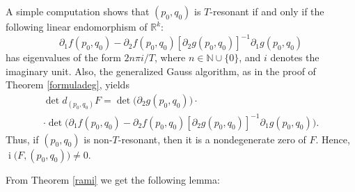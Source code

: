 \documentclass[a4paper]{amsart}
\numberwithin{equation}{section}
\DeclareMathOperator{\idx}{\mathrm{i}}
\newcommand{\R}{\mathbb{R}}
\newcommand{\N}{\mathbb{N}}
\begin{document}
A simple computation shows that $(p_0,q_0)$ is $T$-resonant if and only if the
following linear endomorphism of $\R^k$:
\begin{equation}\label{diffP}
\partial_1 f(p_0,q_0)
             -\partial_2f(p_0,q_0)[\partial_2g(p_0,q_0)]^{-1}\partial_1g(p_0,q_0) 
\end{equation}
has eigenvalues of the form $2n\pi i/T$, where $n\in\N\cup\{0\}$, and $i$ denotes the 
imaginary unit. Also, the generalized Gauss algorithm, as in the proof of Theorem 
\ref{formuladeg}, yields
\begin{multline*}
 \det d_{(p_0,q_0)}F=\det\big(\partial_2g(p_0,q_0)\big)\cdot\\
                      \cdot\det\Big(\partial_1 f(p_0,q_0)
             -\partial_2f(p_0,q_0)[\partial_2g(p_0,q_0)]^{-1}\partial_1g(p_0,q_0)\Big).
\end{multline*}
Thus, if $(p_0,q_0)$ is non-$T$-resonant, then it is a nondegenerate zero of $F$. Hence, 
$\idx\big(F,(p_0,q_0)\big)\neq 0$.

 From Theorem \ref{rami} we get the following lemma:
\end{document}

